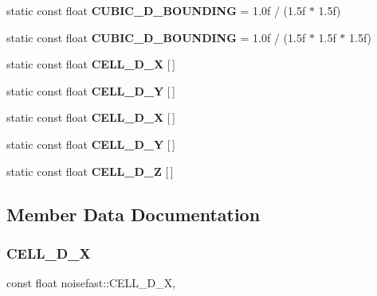 \begin{DoxyCompactItemize}
static const float {\bfseries C\+U\+B\+I\+C\+\_\+D\+\_\+\+B\+O\+U\+N\+D\+I\+NG} = 1.\+0f / (1.\+5f $\ast$ 1.\+5f)
\item 
\mbox{\label{classnoisefast_af8bd9feeebe82d2dd69974a59103a1ac}} 
static const float {\bfseries C\+U\+B\+I\+C\+\_\+D\+\_\+\+B\+O\+U\+N\+D\+I\+NG} = 1.\+0f / (1.\+5f $\ast$ 1.\+5f $\ast$ 1.\+5f)
\item 
static const float {\bfseries C\+E\+L\+L\+\_\+D\+\_\+X} \mbox{[}$\,$\mbox{]}
\item 
static const float {\bfseries C\+E\+L\+L\+\_\+D\+\_\+Y} \mbox{[}$\,$\mbox{]}
\item 
static const float {\bfseries C\+E\+L\+L\+\_\+D\+\_\+X} \mbox{[}$\,$\mbox{]}
\item 
static const float {\bfseries C\+E\+L\+L\+\_\+D\+\_\+Y} \mbox{[}$\,$\mbox{]}
\item 
static const float {\bfseries C\+E\+L\+L\+\_\+D\+\_\+Z} \mbox{[}$\,$\mbox{]}
\end{DoxyCompactItemize}


\subsection{Member Data Documentation}
\mbox{\label{classnoisefast_a14e235cf568e6ebae2f0de6d2f3ac1e4}} 
\subsubsection{\texorpdfstring{C\+E\+L\+L\+\_\+D\+\_\+X}{CELL\_2D\_X}}
{\footnotesize\ttfamily const float noisefast\+::\+C\+E\+L\+L\+\_\+D\+\_\+X\hspace{0.3cm}{\ttfamily [static]}, {\ttfamily [private]}}

